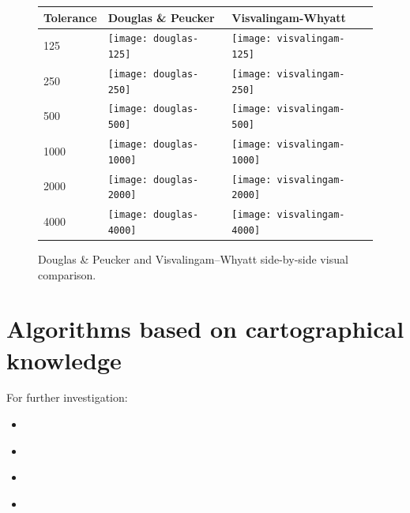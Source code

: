 \documentclass[a4paper]{article}
\newcommand{\DP}{Douglas \& Peucker}
\newcommand{\VW}{Visvalingam--Whyatt}
\begin{document}
\begin{figure}[h]
    \renewcommand{\tabularxcolumn}[1]{>{\center\small}m{#1}}
    \begin{tabularx}{\textwidth}{ p{1.5cm} | X | X | }
        Tolerance                                                 &
        Douglas \& Peucker                                        &
        Visvalingam-Whyatt                                        \tabularnewline \hline

        125                                                       &
        \texttt{[image: douglas-125]}           &
        \texttt{[image: visvalingam-125]}       \tabularnewline \hline

        250                                                       &
        \texttt{[image: douglas-250]}         &
        \texttt{[image: visvalingam-250]}     \tabularnewline \hline

        500                                                       &
        \texttt{[image: douglas-500]}        &
        \texttt{[image: visvalingam-500]}    \tabularnewline \hline

        1000                                                      &
        \texttt{[image: douglas-1000]}      &
        \texttt{[image: visvalingam-1000]}  \tabularnewline \hline

        2000                                                      &
        \texttt{[image: douglas-2000]}     &
        \texttt{[image: visvalingam-2000]} \tabularnewline \hline

        4000                                                      &
        \texttt{[image: douglas-4000]}     &
        \texttt{[image: visvalingam-4000]} \tabularnewline \hline
    \end{tabularx}
    \label{tab:dp-vs-vw}
    \caption{{\DP} and {\VW} side-by-side visual comparison.}
\end{figure}

\section{Algorithms based on cartographical knowledge}

For further investigation:
\begin{itemize}
    \item \cite{jiang2003line}
    \item \cite{dyken2009simultaneous}
    \item \cite{mustafa2006dynamic}
    \item \cite{nollenburg2008morphing}
\end{itemize}
\end{document}
